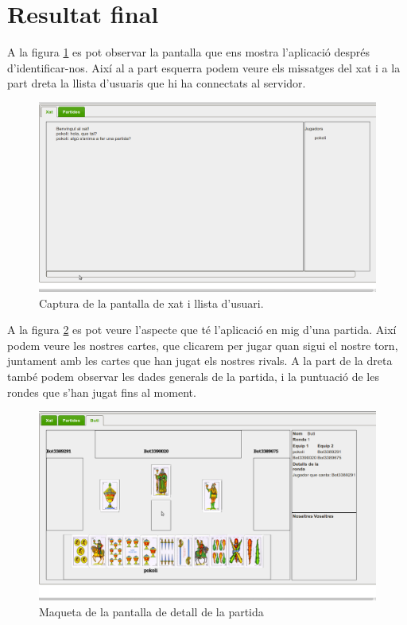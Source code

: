\section{Resultat final}

A la figura \ref{fig:real-xat} es pot observar la pantalla que ens mostra l'aplicació després d'identificar-nos. Així al a part esquerra podem veure els missatges del xat i a la part dreta la llista d'usuaris que hi ha connectats al servidor. 

\begin{figure}[htbp]
\centering\includegraphics[width=15cm]{img/real-xat.png}
\caption{Captura de la pantalla de xat i llista d'usuari.}
\label{fig:real-xat}
\end{figure} 

A la figura \ref{fig:real-partida} es pot veure l'aspecte que té l'aplicació en mig d'una partida. Així podem veure les nostres cartes, que clicarem per jugar quan sigui el nostre torn, juntament amb les cartes que han jugat els nostres rivals. A la part de la dreta també podem observar les dades generals de la partida, i la puntuació de les rondes que s'han jugat fins al moment. 
\begin{figure}[htbp]
\centering\includegraphics[width=15cm]{img/real-partida.png}
\caption{Maqueta de la pantalla de detall de la partida}
\label{fig:real-partida}
\end{figure} 


